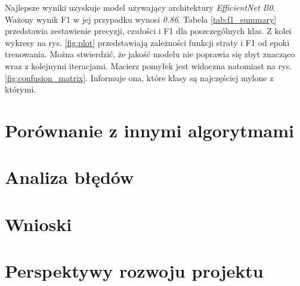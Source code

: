 Najlepsze wyniki uzyskuje model używający architektury \textit{EfficientNet B0}. Ważony wynik F1 w jej przypadku wynosi \textit{0.86}.
Tabela \ref{tab:f1_summary} przedstawia zestawienie precyzji, czułości i F1 dla poszczególnych klas.
Z kolei wykresy na rys. \ref{fig:plot} przedstawiają zależności funkcji straty i F1 od epoki trenowania.
Można stwierdzić, że jakość modelu nie poprawia się zbyt znacząco wraz z kolejnymi iteracjami.
Macierz pomyłek jest widoczna natomiast na rys. \ref{fig:confusion_matrix}.
Informuje ona, które klasy są najczęściej mylone z którymi.

\section{Porównanie z innymi algorytmami}

\section{Analiza błędów}



\section{Wnioski}

\section{Perspektywy rozwoju projektu}